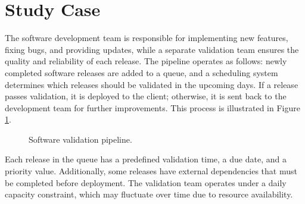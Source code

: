 \documentclass[12pt]{article}
\begin{document}




\section*{Study Case}

The software development team is responsible for implementing new features, fixing bugs, and providing updates, while a separate validation team ensures the quality and reliability of each release. The pipeline operates as follows: newly completed software releases are added to a queue, and a scheduling system determines which releases should be validated in the upcoming days. If a release passes validation, it is deployed to the client; otherwise, it is sent back to the development team for further improvements. This process is illustrated in Figure \ref{fig:pipeline}.

\begin{figure}[h]
    \centering
    \caption{Software validation pipeline.}
    \label{fig:pipeline}
\end{figure}

Each release in the queue has a predefined validation time, a due date, and a priority value. Additionally, some releases have external dependencies that must be completed before deployment. The validation team operates under a daily capacity constraint, which may fluctuate over time due to resource availability.
\end{document}
